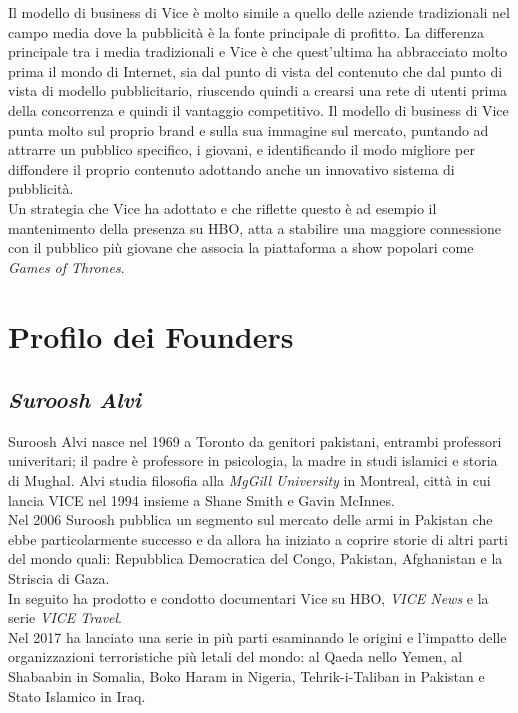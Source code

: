\documentclass[a4paper, 11pt]{article}
\begin{document}
\par Il modello di business di Vice è molto simile a quello delle aziende tradizionali nel campo media dove la pubblicità è la fonte principale di profitto.
La differenza principale tra i media tradizionali e Vice è che quest’ultima ha abbracciato molto prima il mondo di Internet, sia dal punto di vista del contenuto che dal punto di vista di modello pubblicitario, riuscendo quindi a crearsi una rete di utenti prima della concorrenza e quindi il vantaggio competitivo.
Il modello di business di Vice punta molto sul proprio brand e sulla sua immagine sul mercato, puntando ad attrarre un pubblico specifico, i giovani, e identificando il modo migliore per diffondere il proprio contenuto  adottando anche un innovativo sistema di pubblicità.\\
Un strategia che Vice ha adottato e che riflette questo è ad esempio il mantenimento della presenza su HBO, atta a stabilire una maggiore connessione con il pubblico più giovane che associa la piattaforma a show popolari come \textit{Games of Thrones}.


\section*{Profilo dei Founders}
\subsection*{\textit{Suroosh Alvi}}
Suroosh Alvi nasce nel 1969 a Toronto da genitori pakistani, entrambi professori univeritari; il padre è professore in psicologia, la madre in studi islamici e storia di Mughal.
Alvi studia filosofia alla \textit{MgGill University} in Montreal, città in cui lancia VICE nel 1994 insieme a Shane Smith e Gavin McInnes.\\
Nel 2006 Suroosh pubblica un segmento sul mercato delle armi in Pakistan che ebbe particolarmente successo e da allora ha iniziato a coprire storie di altri parti del mondo quali: Repubblica Democratica del Congo, Pakistan, Afghanistan e la Striscia di Gaza.\\
In seguito ha prodotto e condotto documentari Vice su HBO, \textit{VICE News} e la serie \textit{VICE Travel}.\\
Nel 2017 ha lanciato una serie in più parti esaminando le origini e l'impatto delle organizzazioni terroristiche più letali del mondo: al Qaeda nello Yemen, al Shabaabin in Somalia, Boko Haram in Nigeria, Tehrik-i-Taliban in Pakistan e Stato Islamico in Iraq.
\end{document}
